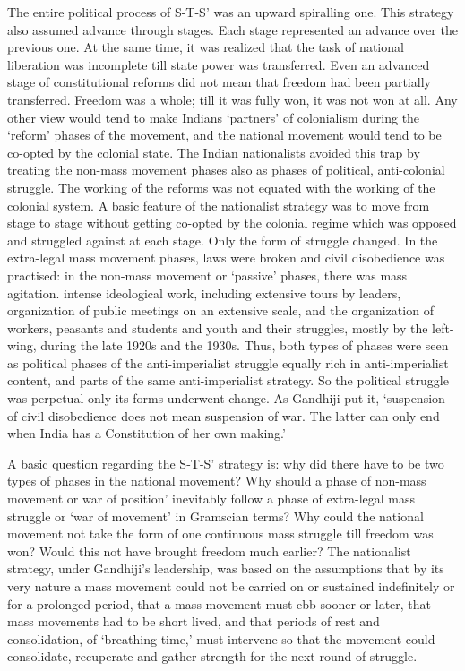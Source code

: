The entire political process of S-T-S' was an upward spiralling one. This strategy also assumed advance through stages. Each stage represented an advance over the previous one. At the same time, it was realized that the task of national liberation was incomplete till state power was transferred. Even an advanced stage of constitutional reforms did not mean that freedom had been partially transferred. Freedom was a whole; till it was fully won, it was not won at all. Any other view would tend to make Indians `partners' of colonialism during the `reform' phases of the movement, and the national movement would tend to be co-opted by the colonial state. The Indian nationalists avoided this trap by treating the non-mass movement phases also as phases of political, anti-colonial struggle. The working of the reforms was not equated with the working of the colonial system. A basic feature of the nationalist strategy was to move from stage to stage without getting co-opted by the colonial regime which was opposed and struggled against at each stage. Only the form of struggle changed. In the extra-legal mass movement phases, laws were broken and civil disobedience was practised: in the non-mass movement or `passive' phases, there was mass agitation. intense ideological work, including extensive tours by leaders, organization of public meetings on an extensive scale, and the organization of workers, peasants and students and youth and their struggles, mostly by the left-wing, during the late 1920s and the 1930s. Thus, both types of phases were seen as political phases of the anti-imperialist struggle equally rich in anti-imperialist content, and parts of the same anti-imperialist strategy. So the political struggle was perpetual only its forms underwent change. As Gandhiji put it, `suspension of civil disobedience does not mean suspension of war. The latter can only end when India has a Constitution of her own making.'

A basic question regarding the S-T-S' strategy is: why did there have to be two types of phases in the national movement? Why should a phase of non-mass movement or war of position' inevitably follow a phase of extra-legal mass struggle or `war of movement' in Gramscian terms? Why could the national movement not take the form of one continuous mass struggle till freedom was won? Would this not have brought freedom much earlier? The nationalist strategy, under Gandhiji's leadership, was based on the assumptions that by its very nature a mass movement could not be carried on or sustained indefinitely or for a prolonged period, that a mass movement must ebb sooner or later, that mass movements had to be short lived, and that periods of rest and consolidation, of `breathing time,' must intervene so that the movement could consolidate, recuperate and gather strength for the next round of struggle.

